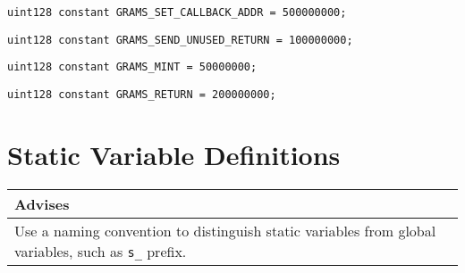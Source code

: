 \begin{lstlisting}[firstnumber=65]
  uint128 constant GRAMS_SET_CALLBACK_ADDR = 500000000;
\end{lstlisting}

\begin{lstlisting}[firstnumber=66]
  uint128 constant GRAMS_SEND_UNUSED_RETURN = 100000000;
\end{lstlisting}

\begin{lstlisting}[firstnumber=67]
  uint128 constant GRAMS_MINT = 50000000;
\end{lstlisting}

\begin{lstlisting}[firstnumber=68]
  uint128 constant GRAMS_RETURN = 200000000;
\end{lstlisting}

\section{Static Variable Definitions}


\ifsoldraft
\noindent\begin{tabular}{|p{12cm}|}\hline
\rowcolor{green}Advises
\\\hline
Use a naming convention to distinguish static variables from global variables, such as \verb+s_+ prefix.
\\\hline\end{tabular}
\fi

